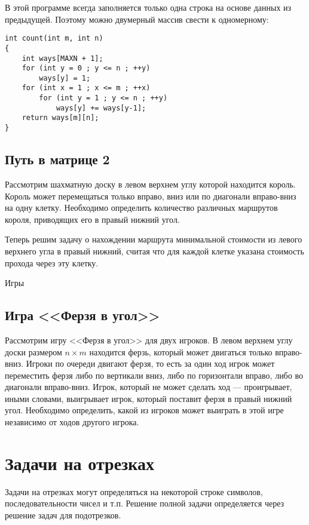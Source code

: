 \documentclass[14pt,openany]{book}
\begin{document}
В этой программе всегда заполняется только одна строка на основе данных из предыдущей.
Поэтому можно двумерный массив свести к одномерному:

\begin{lstlisting}
int count(int m, int n)
{
    int ways[MAXN + 1];
    for (int y = 0 ; y <= n ; ++y)
        ways[y] = 1;
    for (int x = 1 ; x <= m ; ++x)
        for (int y = 1 ; y <= n ; ++y)
       	    ways[y] += ways[y-1];
    return ways[m][n];
}
\end{lstlisting}

\section{Путь в матрице 2}

Рассмотрим шахматную доску в левом верхнем углу которой находится король. Король может перемещаться только вправо, вниз или по диагонали вправо-вниз на одну клетку. Необходимо определить количество различных маршрутов короля, приводящих его в правый нижний угол.

Теперь решим задачу о нахождении маршрута минимальной стоимости из левого верхнего угла в правый нижний, считая что для каждой клетке указана стоимость прохода через эту клетку.

Игры

\section{Игра <<Ферзя в угол>>}

Рассмотрим игру <<Ферзя в угол>> для двух игроков. В левом верхнем углу доски размером $n \times m$ 
находится ферзь, который может двигаться только вправо-вниз. Игроки по очереди двигают ферзя, то есть 
за один ход игрок может переместить ферзя либо по вертикали вниз, либо по горизонтали вправо, либо во 
диагонали вправо-вниз. Игрок, который не может сделать ход — проигрывает, иными словами, выигрывает 
игрок, который поставит ферзя в правый нижний угол. Необходимо определить, какой из игроков может 
выиграть в этой игре независимо от ходов другого игрока.


\chapter{Задачи на отрезках}

Задачи на отрезках могут определяться на некоторой строке символов, последовательности чисел
и т.п. Решение полной задачи определяется через решение задач для подотрезков.
\end{document}

